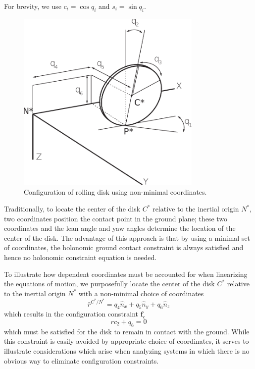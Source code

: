 \documentclass[smallcondensed,final]{svjour3}                     %
\begin{document}
For brevity, we use $c_i=\cos{q_i}$ and $s_i=\sin{q_i}$.

\begin{figure}[!htb]
    \centering
    \includegraphics[width=0.8\textwidth]{disk_drawing_cropped.pdf}
    \caption{Configuration of rolling disk using non-minimal coordinates.}
    \label{fig:rolling_disk}
\end{figure}

Traditionally, to locate the center of the disk $C^*$ relative to the inertial
origin $N^*$, two coordinates position the contact point in the ground plane;
these two coordinates and the lean angle and yaw angles determine the location
of the center of the disk. The advantage of this approach is that by using a
minimal set of coordinates, the holonomic ground contact constraint is always
satisfied and hence no holonomic constraint equation is needed.

To illustrate how dependent coordinates must be
accounted for when linearizing the equations of motion, we purposefully locate
the center of the disk $C^*$ relative to the inertial origin $N^*$ with a
non-minimal choice of coordinates
\begin{equation*}
  \bar{r}^{C^*/N^*} = q_4 \hat{n}_x + q_5 \hat{n}_y + q_6 \hat{n}_z
\end{equation*}
which results in the configuration constraint $\mathbf{f}_c$
\begin{equation}
  \label{rd:f_c}
  rc_2 + q_6 = 0
\end{equation}
which must be satisfied for the disk to remain in contact with the ground.
While this constraint is easily avoided by appropriate choice of coordinates,
it serves to illustrate considerations which arise when analyzing systems in
which there is no obvious way to eliminate configuration constraints.
\end{document}
